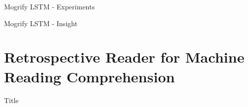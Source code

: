 \documentclass[10pt]{beamer}
\begin{document}
\begin{frame}{Mogrify LSTM - Experiments}

    \begin{figure}
        \begin{center}
        \end{center}
    \end{figure}
\end{frame}

\begin{frame}{Mogrify LSTM - Insight}

\end{frame}


\section{Retrospective Reader for Machine Reading Comprehension}

\begin{frame}{Title}
    \begin{figure}
        \begin{center}
        \end{center}
    \end{figure}
    
\end{frame}
\end{document}
